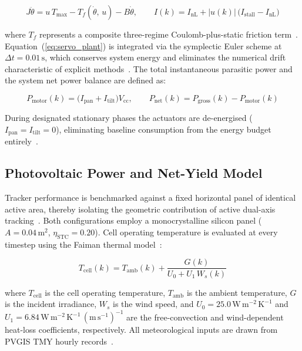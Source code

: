 \documentclass[preprint,3p,12pt]{elsarticle}
\newcommand{\dt}{\Delta t}
\begin{document}
\begin{equation}
    J\ddot{\theta} = u\,T_{\max}
    - T_f(\dot{\theta},\,u) - B\dot{\theta}, \qquad
    I(k) = I_{\mathrm{nL}}
    + \lvert u(k)\rvert\,
    \bigl(I_{\mathrm{stall}} - I_{\mathrm{nL}}\bigr)
    \label{eq:servo_plant}
\end{equation}

where $T_f$ represents a composite three-regime Coulomb-plus-static friction term~\cite{Astrom2008}. Equation~(\ref{eq:servo_plant}) is integrated via the symplectic Euler scheme at $\dt = 0.01\,\mathrm{s}$, which conserves system energy and eliminates the numerical drift characteristic of explicit methods~\cite{Hairer2006}. The total instantaneous parasitic power and the system net power balance are defined as:

\begin{equation}
    P_{\mathrm{motor}}(k) =
    \bigl(I_{\mathrm{pan}} + I_{\mathrm{tilt}}\bigr)V_{\mathrm{cc}},
    \qquad
    P_{\mathrm{net}}(k) =
    P_{\mathrm{gross}}(k) - P_{\mathrm{motor}}(k)
    \label{eq:power_balance}
\end{equation}

During designated stationary phases the actuators are de-energised ($I_{\mathrm{pan}} = I_{\mathrm{tilt}} = 0$), eliminating baseline consumption from the energy budget entirely~\cite{Rubio2007}.

\subsection{Photovoltaic Power and Net-Yield Model}
\label{sec:pv_model}

Tracker performance is benchmarked against a fixed horizontal panel of identical active area, thereby isolating the geometric contribution of active dual-axis tracking~\cite{Tan2021}. Both configurations employ a monocrystalline silicon panel ($A = 0.04\,\mathrm{m}^2$, $\eta_{\mathrm{STC}} = 0.20$). Cell operating temperature is evaluated at every timestep using the Faiman thermal model~\cite{Faiman2008}:

\begin{equation}
    T_{\mathrm{cell}}(k) = T_{\mathrm{amb}}(k) +
    \frac{G(k)}{U_0 + U_1\,W_s(k)}
    \label{eq:faiman}
\end{equation}

where $T_{\mathrm{cell}}$ is the cell operating temperature, $T_{\mathrm{amb}}$ is the ambient temperature, $G$ is the incident irradiance, $W_s$ is the wind speed, and $U_0 = 25.0\,\mathrm{W\,m^{-2}\,K^{-1}}$ and $U_1 = 6.84\,\mathrm{W\,m^{-2}\,K^{-1}\,(m\,s^{-1})^{-1}}$ are the free-convection and wind-dependent heat-loss coefficients, respectively. All meteorological inputs are drawn from PVGIS TMY hourly records~\cite{PVGIS2023}.
\end{document}
